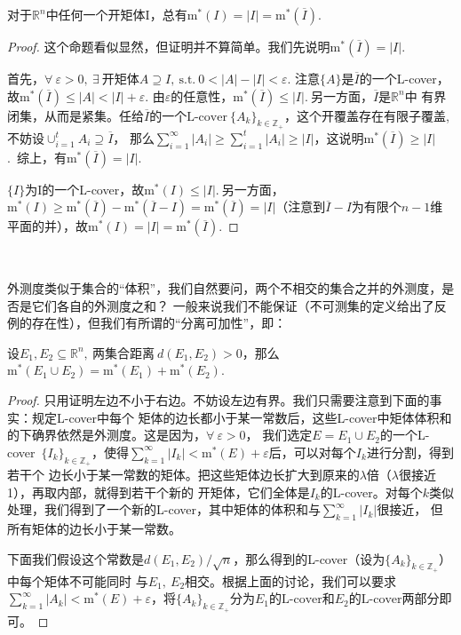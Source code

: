 \documentclass[color=green,thmcnt=section,lang=cn,12pt]{elegantbook}
\numberwithin{equation}{section}%
\numberwithin{figure}{section}%
\newcommand{\RR}{\mathbb{R}}
\renewcommand{\RN}{\RR^n}
\newcommand{\ZZ}{\mathbb{Z}}
\newcommand{\ee}{\varepsilon}
\newcommand{\any}{\forall \ }
\newcommand{\exi}{\exists \ }
\newcommand{\sothat}{\ \textrm{s.t.}\ }
\newcommand{\csf}[1]{\{#1_k\}_{k\in \ZZ_+}} %
\newcommand{\cs}[1]{\sum_{#1=1}^{\infty}} %
\newcommand{\mx}[1]{\textrm{m}^*(#1)} %
\newcommand{\lcover}{\textrm{L-cover}} %
\begin{document}
\begin{proposition}
    对于$\RN$中任何一个开矩体I，总有$\mx{I}=|I|=\mx{\overline{I}}.$
\end{proposition}
\begin{proof}
    这个命题看似显然，但证明并不算简单。我们先说明$\mx{\overline{I}}=|I|.$


    首先，$\any \ee>0,\ \exi \mbox{开矩体}A\supseteq I,\sothat 0<|A|-|I|<\ee.$
    注意$\{A\}$是$\overline{I}$的一个L-cover，故$\mx{\overline{I}}\leq |A|<|I|+\ee$.
    由$\ee$的任意性，$\mx{\overline{I}}\leq |I|.\ $另一方面，$\overline{I}$是$\RN$中
    有界闭集，从而是紧集。任给$\overline{I}$的一个$\lcover\ \csf{A}$，这个开覆盖存在有限子覆盖,
    不妨设$\cup_{i=1}^tA_i\supseteq \overline{I}$，
    那么$\cs{i}|A_i| \geq \sum_{i=1}^{t}|A_i|\geq |I|$，这说明$\mx{\overline{I}}\geq |I|$.\ 
    综上，有$\mx{\overline{I}}=|I|.$\ 


    $\{I\}$为I的一个L-cover，故$\mx{I}\leq |I|.\ $另一方面，$\mx{I}\geq \mx{\overline{I}}-\mx{\overline{I}-I}=
    \mx{\overline{I}}=|I|$（注意到$\overline{I}-I$为有限个$n-1$维平面的并），故$\mx{I}=|I|=\mx{\overline{I}}.$
\end{proof}
\ 


外测度类似于集合的``体积''，我们自然要问，两个不相交的集合之并的外测度，是否是它们各自的外测度之和？
一般来说我们不能保证（不可测集的定义给出了反例的存在性），但我们有所谓的``分离可加性''，即：
\begin{proposition}[分离可加性]\label{fenlikejiaxing}
    设$E_1,E_2\subseteq \RN,\ \mbox{两集合距离}\ d(E_1,E_2)>0$，那么$\mx{E_1\cup E_2}=\mx{E_1}+\mx{E_2}$.
\end{proposition}
\begin{proof}
    只用证明左边不小于右边。不妨设左边有界。我们只需要注意到下面的事实：规定L-cover中每个
    矩体的边长都小于某一常数后，这些L-cover中矩体体积和的下确界依然是外测度。这是因为，$\any \ee>0$，
    我们选定$E=E_1\cup E_2$的一个L-cover\ $\csf{I}$，使得$\cs{k}|I_k|<\mx{E}+\ee$后，可以对每个$I_k$进行分割，得到若干个
    边长小于某一常数的矩体。把这些矩体边长扩大到原来的$\lambda$倍（$\lambda$很接近1），再取内部，就得到若干个新的
    开矩体，它们全体是$I_k$的L-cover。对每个$k$类似处理，我们得到了一个新的L-cover，其中矩体的体积和与$\cs{k}|I_k|$很接近，
    但所有矩体的边长小于某一常数。


    下面我们假设这个常数是$d(E_1,E_2)/{\sqrt{n}}$，那么得到的L-cover（设为$\csf{A}$）中每个矩体不可能同时
    与$E_1,\ E_2$相交。根据上面的讨论，我们可以要求$\cs{k}|A_k|<\mx{E}+\ee$，将$\csf{A}$分为$E_1$的$\lcover$和$E_2$的$\lcover$两部分即可。
\end{proof}
\ 
\end{document}
